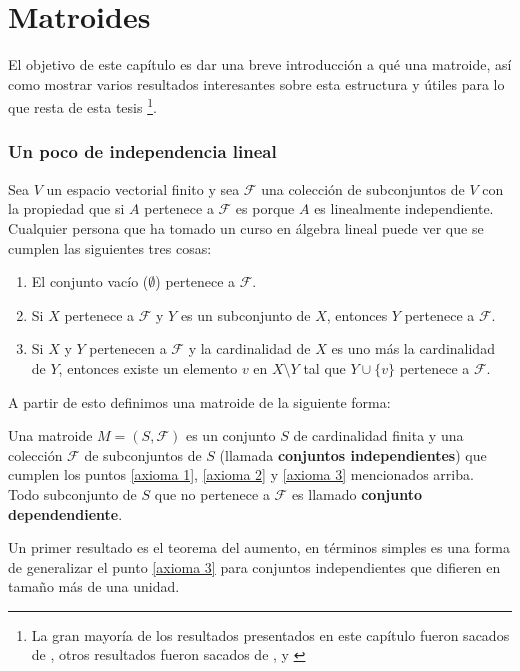 \chapter{Matroides}

El objetivo de este capítulo es dar una breve introducción a qué una matroide, así como mostrar varios resultados interesantes sobre esta estructura y útiles para lo que resta de esta tesis \footnote{La gran mayoría de los resultados presentados en este capítulo fueron sacados de \cite{matroid}, otros resultados fueron sacados de \cite{CO1}, \cite{CO2} y \cite{CO3}}.

\subsection*{Un poco de independencia lineal}
Sea $V$ un espacio vectorial finito y sea $\mathcal{F}$ una colección de subconjuntos de $V$ con la propiedad que si $A$ pertenece a $\mathcal{F}$ es porque $A$ es linealmente independiente. Cualquier persona que ha tomado un curso en álgebra lineal puede ver que se cumplen las siguientes tres cosas: 
\begin{enumerate}
\item El conjunto vacío ($\emptyset$) pertenece a $\mathcal{F}$. \label{axioma 1}
\item Si $X$ pertenece a $\mathcal{F}$ y $Y$ es un subconjunto de $X$, entonces $Y$ pertenece a $\mathcal{F}$. \label{axioma 2}
\item Si $X$ y $Y$ pertenecen a $\mathcal{F}$ y la cardinalidad de $X$ es uno más la cardinalidad de $Y$, entonces existe un elemento $v$ en $X \setminus Y$ tal que $Y \cup \{v\} $ pertenece a $\mathcal{F}$. \label{axioma 3}
\end{enumerate}

A partir de esto definimos una matroide de la siguiente forma:
\begin{dfn}
Una matroide $M=(S, \mathcal{F})$ es un conjunto $S$ de cardinalidad finita y una colección $\mathcal{F}$ de subconjuntos de $S$ (llamada \textbf{conjuntos independientes}) que cumplen los puntos \ref{axioma 1}, \ref{axioma 2} y \ref{axioma 3} mencionados arriba. \\ 
Todo subconjunto de $S$ que no pertenece a $\mathcal{F}$ es llamado \textbf{conjunto dependendiente}.
\end{dfn}


Un primer resultado es el teorema del aumento, en términos simples es una forma de generalizar el punto \ref{axioma 3} para conjuntos independientes que difieren en tamaño más de una unidad. 

